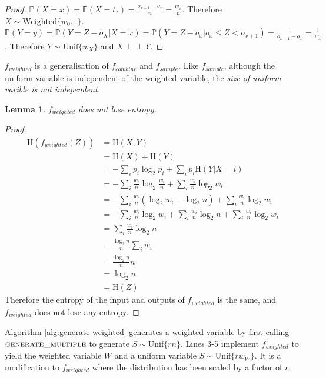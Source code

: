 \documentclass[12pt]{article}
\newtheorem{lemma}{Lemma}
\newcommand{\indep}{\perp\!\!\!\perp}
\newcommand{\unif}[1]{\mathrm{Unif}\{#1\}}
\newcommand{\entropy}[1]{\mathrm{H}(#1)}
\newcommand{\prob}[1]{\mathbb{P}(#1)}
\begin{document}
\begin{proof}
    $\prob{X=x} = \prob{X = t_z} = \frac{o_{x+1} - o_x}{n} = \frac{w_x}{n}$. Therefore $X \sim \mathrm{Weighted}\{w_0 ...\}$.  $\prob{Y=y} = \prob{Y = Z - o_X | X = x} = \prob{Y = Z - o_x | o_{x} \le Z < o_{x+1}} = \frac{1}{o_{x+1}-o_x} = \frac{1}{w_x}$. Therefore $Y \sim \unif{w_X}$ and $X \indep Y$.
\end{proof}

$f_{weighted}$ is a generalisation of $f_{combine}$ and $f_{sample}$. Like $f_{sample}$, although the uniform variable is independent of the weighted variable, the \em size \em of uniform varible is not independent.

\begin{lemma}
    \label{lem:distribution-conservation}
    $f_{weighted}$ does not lose entropy.
\end{lemma}

\begin{proof}
    \begin{align}
    \entropy{f_{weighted}(Z)}
               &= \entropy{X,Y} \\
               &=  \entropy{X} + \entropy{Y} \\
               & = - \sum_i p_i \log_2p_i + \sum_i p_i\entropy{Y|X=i} \\
               & = - \sum_i \frac{w_i}{n} \log_2 \frac{w_i}{n} + \sum_i \frac{w_i}{n}\log_2 w_i \\
               & = - \sum_i \frac{w_i}{n}(\log_2 w_i - \log_2 n) + \sum_i \frac{w_i}{n}\log_2 w_i \\
               & = - \sum_i \frac{w_i}{n}\log_2 w_i + \sum_i \frac{w_i}{n} \log_2 n + \sum_i \frac{w_i}{n}\log_2 w_i \\
               & = \sum_i \frac{w_i}{n} \log_2 n \\
               & = \frac{\log_2 n}{n} \sum_i w_i \\
               & = \frac{\log_2 n}{n} n \\
               & = \log_2 n \\
               & = \entropy{Z}
    \end{align}
    Therefore the entropy of the input and outputs of $f_{weighted}$ is the same, and $f_{weighted}$ does not lose any entropy.
\end{proof}

Algorithm \ref{alg:generate-weighted} generates a weighted variable by first calling $\textsc{generate\_multiple}$ to generate $S \sim \unif{rn}$. Lines 3-5 implement $f_{weighted}$ to yield the weighted variable $W$ and a uniform variable $S \sim \unif{rw_W}$. It is a modification to $f_{weighted}$ where the distribution has been scaled by a factor of $r$.
\end{document}

